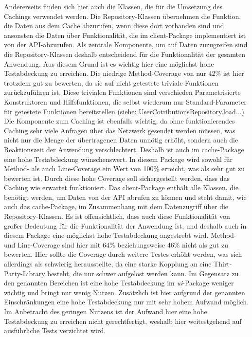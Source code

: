 Andererseits finden sich hier auch die Klassen, die für die Umsetzung des Cachings verwendet werden.
Die Repository-Klassen übernehmen die Funktion, die Daten aus dem Cache abzurufen, wenn diese dort vorhanden sind und ansonsten die Daten über Funktionalität, die im client-Package implementiert ist von der API-abzurufen.
Als zentrale Komponente, um auf Daten zuzugreifen sind die Repository-Klassen deshalb  entscheidend für die Funktionalität der gesamten Anwendung.
Aus diesem Grund ist es wichtig hier eine möglichst hohe Testabdeckung zu erreichen.
Die niedrige Method-Coverage von nur 42\% ist hier trotzdem gut zu bewerten, da sie auf nicht getestete triviale Funktionen zurückzuführen ist.
Diese trivialen Funktionen sind verschieden Parametrisierte Konstruktoren und Hilfsfunktionen, die selbst wiederum nur Standard-Parameter für getestete Funktionen bereitstellen (siehe: \href{https://github.com/lukaspanni/OpenSourceStats/blob/ac3c4098d8f89f5eed7142d675ca49c4d3dd724f/app/src/main/java/de/lukaspanni/opensourcestats/repository/UserContributionsRepository.java#L51-L65}{UserCotributionsRepository.load...})
\newline
Die Komponente zum Caching ist ebenfalls wichtig, da ohne funktionierendes Caching sehr viele Anfragen über das Netzwerk gesendet werden müssen, was nicht nur die Menge der übertragenen Daten unnötig erhöht, sondern auch die Reaktionszeit der Anwendung verschlechtert.
Deshalb ist  auch im cache-Package eine hohe Testabdeckung wünschenswert.
In diesem Package wird sowohl für Method- als auch Line-Coverage ein Wert von 100\% erreicht, was als sehr gut zu bewerten ist.
Durch diese hohe Coverage soll sichergestellt werden, dass das Caching wie erwartet funktioniert.
\newline
\newline
Das client-Package enthält alle Klassen, die benötigt werden, um Daten von der API abrufen zu können und steht damit, wie auch das cache-Package, im Zusammenhang mit dem Datenzugriff über die Repository-Klassen.
Es ist offensichtlich, dass auch diese Funktionalität von großer Bedeutung für die Funktionalität der Anwendung ist, und deshalb auch in diesem Package eine möglichst hohe Testabdeckung angestrebt wird.
Method- und Line-Coverage sind hier mit 64\% beziehungsweise 46\% nicht als gut zu bewerten. Hier sollte die Coverage durch weitere Testes erhöht werden, was sich allerdings als schwierig herausstellte, da eine starke Kopplung an eine Thirt-Party-Library besteht, die nur schwer aufgelöst werden kann.
\newline
\newline
Im Gegensatz zu den genannten Bereichen ist eine hohe Testabdeckung im \textit{ui}-Package weniger wichtig und bringt nur wenig Nutzen. 
Zusätzlich ist hier aufgrund der genannten Einschränkungen eine hohe Testabdeckung nur mit sehr hohem Aufwand möglich.
Im Anbetracht des geringen Nutzens ist der Aufwand hier eine hohe Testabdeckung zu erreichen nicht gerechtfertigt, weshalb hier weitestgehend auf ausführliche Tests verzichtet wird.

